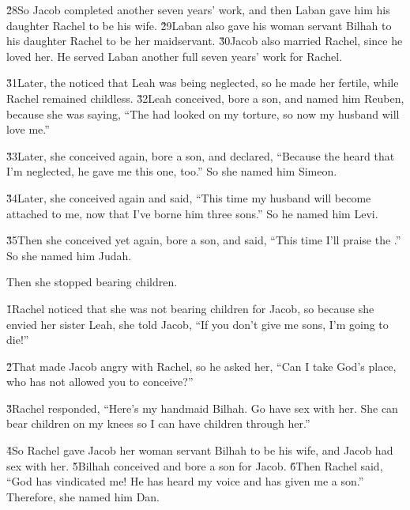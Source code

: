 \v{28}So Jacob completed another seven years' work, and then Laban gave him his daughter Rachel to be his wife. \v{29}Laban also gave his woman servant Bilhah to his daughter Rachel to be her maidservant. \v{30}Jacob also married Rachel, since he loved her. He served Laban another full seven years' work for Rachel.

\v{31}Later, the  noticed that Leah was being neglected, so he made her fertile, while Rachel remained childless. \v{32}Leah conceived, bore a son, and named him Reuben, because she was saying, ``The  had looked on my torture, so now my husband will love me.''

\v{33}Later, she conceived again, bore a son, and declared, ``Because the  heard that I'm neglected, he gave me this one, too.'' So she named him Simeon.

\v{34}Later, she conceived again and said, ``This time my husband will become attached to me, now that I've borne him three sons.'' So he named him Levi.

\v{35}Then she conceived yet again, bore a son, and said, ``This time I'll praise the .'' So she named him Judah.

Then she stopped bearing children.

\v{1}Rachel noticed that she was not bearing children for Jacob, so because she envied her sister Leah, she told Jacob, ``If you don't give me sons, I'm going to die!''

\v{2}That made Jacob angry with Rachel, so he asked her, ``Can I take God's place, who has not allowed you to conceive?''

\v{3}Rachel responded, ``Here's my handmaid Bilhah. Go have sex with her. She can bear children on my knees so I can have children through her.''

\v{4}So Rachel gave Jacob her woman servant Bilhah to be his wife, and Jacob had sex with her. \v{5}Bilhah conceived and bore a son for Jacob. \v{6}Then Rachel said, ``God has vindicated me! He has heard my voice and has given me a son.'' Therefore, she named him Dan.

